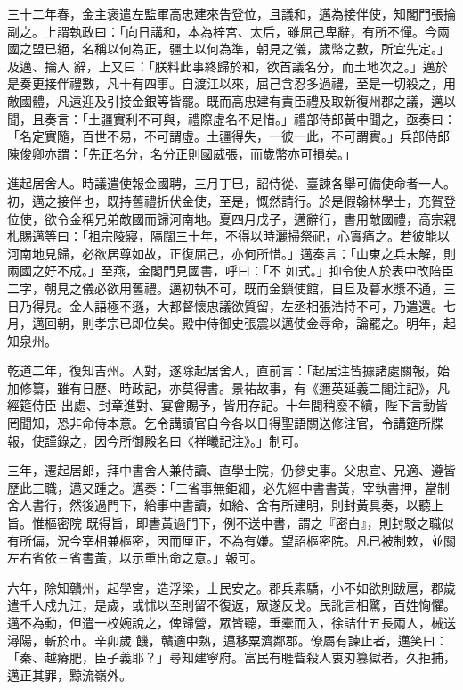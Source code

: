 \begin{pinyinscope}
 三十二年春，金主褒遣左監軍高忠建來告登位，且議和，邁為接伴使，知閣門張掄副之。上謂執政曰：「向日講和，本為梓宮、太后，雖屈己卑辭，有所不憚。今兩國之盟已絕，名稱以何為正，疆土以何為準，朝見之儀，歲幣之數，所宜先定。」及邁、掄入
 辭，上又曰：「朕料此事終歸於和，欲首議名分，而土地次之。」邁於是奏更接伴禮數，凡十有四事。自渡江以來，屈己含忍多過禮，至是一切殺之，用敵國體，凡遠迎及引接金銀等皆罷。既而高忠建有責臣禮及取新復州郡之議，邁以聞，且奏言：「土疆實利不可與，禮際虛名不足惜。」禮部侍郎黃中聞之，亟奏曰：「名定實隨，百世不易，不可謂虛。土疆得失，一彼一此，不可謂實。」兵部侍郎陳俊卿亦謂：「先正名分，名分正則國威張，而歲幣亦可損矣。」



 進起居舍人。時議遣使報金國聘，三月丁巳，詔侍從、臺諫各舉可備使命者一人。初，邁之接伴也，既持舊禮折伏金使，至是，慨然請行。於是假翰林學士，充賀登位使，欲令金稱兄弟敵國而歸河南地。夏四月戊子，邁辭行，書用敵國禮，高宗親札賜邁等曰：「祖宗陵寢，隔闊三十年，不得以時灑掃祭祀，心實痛之。若彼能以河南地見歸，必欲居尊如故，正復屈己，亦何所惜。」邁奏言：「山東之兵未解，則兩國之好不成。」至燕，金閣門見國書，呼曰：「不
 如式。」抑令使人於表中改陪臣二字，朝見之儀必欲用舊禮。邁初執不可，既而金鎖使館，自旦及暮水漿不通，三日乃得見。金人語極不遜，大都督懷忠議欲質留，左丞相張浩持不可，乃遣還。七月，邁回朝，則孝宗已即位矣。殿中侍御史張震以邁使金辱命，論罷之。明年，起知泉州。



 乾道二年，復知吉州。入對，遂除起居舍人，直前言：「起居注皆據諸處關報，始加修纂，雖有日歷、時政記，亦莫得書。景祐故事，有《邇英延義二閣注記》，凡經筵侍臣
 出處、封章進對、宴會賜予，皆用存記。十年間稍廢不續，陛下言動皆罔聞知，恐非命侍本意。乞令講讀官自今各以日得聖語關送修注官，令講筵所牒報，使謹錄之，因今所御殿名曰《祥曦記注》。」制可。



 三年，遷起居郎，拜中書舍人兼侍讀、直學士院，仍參史事。父忠宣、兄適、遵皆歷此三職，邁又踵之。邁奏：「三省事無鉅細，必先經中書書黃，宰執書押，當制舍人書行，然後過門下，給事中書讀，如給、舍有所建明，則封黃具奏，以聽上旨。惟樞密院
 既得旨，即書黃過門下，例不送中書，謂之『密白』，則封駁之職似有所偏，況今宰相兼樞密，因而厘正，不為有嫌。望詔樞密院。凡已被制敕，並關左右省依三省書黃，以示重出命之意。」報可。



 六年，除知贛州，起學宮，造浮梁，士民安之。郡兵素驕，小不如欲則跋扈，郡歲遣千人戍九江，是歲，或怵以至則留不復返，眾遂反戈。民訛言相驚，百姓恟懼。邁不為動，但遣一校婉說之，俾歸營，眾皆聽，垂橐而入，徐詰什五長兩人，械送潯陽，斬於市。辛卯歲
 饑，贛適中熟，邁移粟濟鄰郡。僚屬有諫止者，邁笑曰：「秦、越瘠肥，臣子義耶？」尋知建寧府。富民有睚眥殺人衷刃篡獄者，久拒捕，邁正其罪，黥流嶺外。




\end{pinyinscope}
